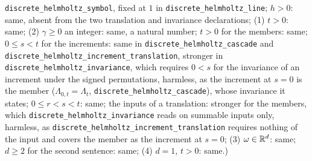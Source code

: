 \begin{proposition}
{\texttt{discrete\_helmholtz\_symbol}, fixed at $1$ in \texttt{discrete\_helmholtz\_line}; $h > 0$:
same, absent from the two translation and invariance declarations; (1) $t > 0$: same; (2)
$\gamma \ge 0$ an integer: same, a natural number; $t > 0$ for the members: same; $0 \le s < t$
for the increments: same in \texttt{discrete\_helmholtz\_cascade} and
\texttt{discrete\_helmholtz\_increment\_translation}, stronger in
\texttt{discrete\_helmholtz\_invariance}, which requires $0 < s$ for the invariance of an increment
under the signed permutations, harmless, as the increment at $s = 0$ is the member
($\Lambda_{0,t} = \Lambda_t$, \texttt{discrete\_helmholtz\_cascade}), whose invariance it states;
$0 \le r < s < t$: same; the inputs of a translation: stronger for the members, which
\texttt{discrete\_helmholtz\_invariance} reads on summable inputs only, harmless, as
\texttt{discrete\_helmholtz\_increment\_translation} requires nothing of the input and covers the member
as the increment at $s = 0$; (3) $\omega \in \mathbb{R}^d$: same; $d \ge 2$ for the second sentence: same;
(4) $d = 1$, $t > 0$: same.)}
\end{proposition}

